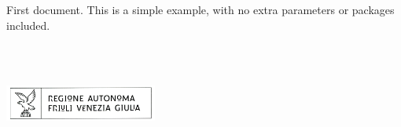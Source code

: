 \documentclass{article}
\begin{document}
First document. This is a simple example, with no 
extra parameters or packages included.

\includegraphics[width=5cm, height=4cm]{logo_regione.png}
\end{document}
